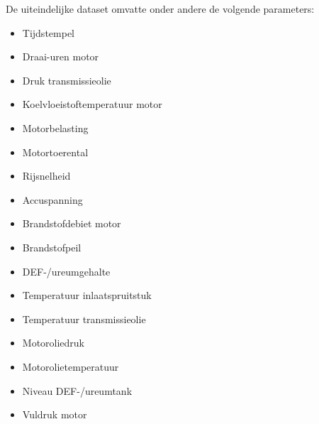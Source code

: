  
 
 De uiteindelijke dataset omvatte onder andere de volgende parameters:
 
 \begin{itemize}
     \item Tijdstempel
     
     \item Draai-uren motor
     
     \item Druk transmissieolie
     
     \item Koelvloeistoftemperatuur motor
     
     \item Motorbelasting
     
     \item Motortoerental
     
     \item Rijsnelheid
     
     \item Accuspanning
     
     \item Brandstofdebiet motor
     
     \item Brandstofpeil
     
     \item DEF-/ureumgehalte
     
     \item Temperatuur inlaatspruitstuk
     
     \item Temperatuur transmissieolie
     
     \item Motoroliedruk
     
     \item Motorolietemperatuur
     
     \item Niveau DEF-/ureumtank
     
     \item Vuldruk motor
 \end{itemize}
 
